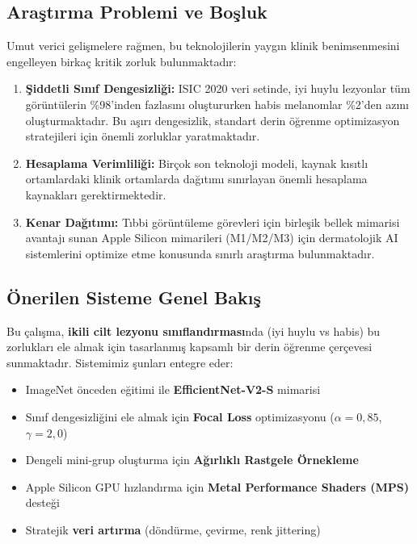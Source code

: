 \documentclass[12pt,a4paper]{article}
\begin{document}
\subsection{Araştırma Problemi ve Boşluk}

Umut verici gelişmelere rağmen, bu teknolojilerin yaygın klinik benimsenmesini engelleyen birkaç kritik zorluk bulunmaktadır:

\begin{enumerate}
    \item \textbf{Şiddetli Sınıf Dengesizliği:} ISIC 2020 veri setinde, iyi huylu lezyonlar tüm görüntülerin \%98'inden fazlasını oluştururken habis melanomlar \%2'den azını oluşturmaktadır. Bu aşırı dengesizlik, standart derin öğrenme optimizasyon stratejileri için önemli zorluklar yaratmaktadır.
    
    \item \textbf{Hesaplama Verimliliği:} Birçok son teknoloji modeli, kaynak kısıtlı ortamlardaki klinik ortamlarda dağıtımı sınırlayan önemli hesaplama kaynakları gerektirmektedir.
    
    \item \textbf{Kenar Dağıtımı:} Tıbbi görüntüleme görevleri için birleşik bellek mimarisi avantajı sunan Apple Silicon mimarileri (M1/M2/M3) için dermatolojik AI sistemlerini optimize etme konusunda sınırlı araştırma bulunmaktadır.
\end{enumerate}

\subsection{Önerilen Sisteme Genel Bakış}

Bu çalışma, \textbf{ikili cilt lezyonu sınıflandırması}nda (iyi huylu vs habis) bu zorlukları ele almak için tasarlanmış kapsamlı bir derin öğrenme çerçevesi sunmaktadır. Sistemimiz şunları entegre eder:

\begin{itemize}
    \item ImageNet önceden eğitimi ile \textbf{EfficientNet-V2-S} mimarisi
    \item Sınıf dengesizliğini ele almak için \textbf{Focal Loss} optimizasyonu ($\alpha=0,85$, $\gamma=2,0$)
    \item Dengeli mini-grup oluşturma için \textbf{Ağırlıklı Rastgele Örnekleme}
    \item Apple Silicon GPU hızlandırma için \textbf{Metal Performance Shaders (MPS)} desteği
    \item Stratejik \textbf{veri artırma} (döndürme, çevirme, renk jittering)
\end{itemize}
\end{document}

